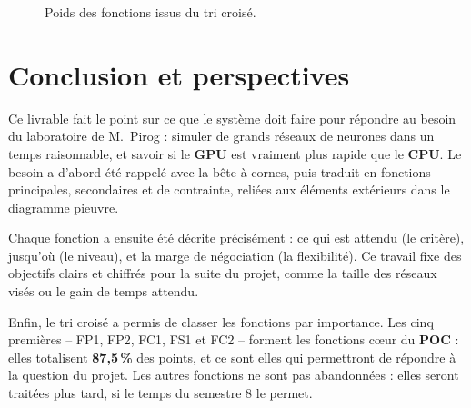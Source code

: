 \documentclass{report}
\begin{document}
\begin{figure}[H]
\centering
{}
\caption{Poids des fonctions issus du tri croisé.}
\label{fig:barres}
\end{figure}

\chapter{Conclusion et perspectives}

Ce livrable fait le point sur ce que le système doit faire pour répondre au besoin du laboratoire de M.~Pirog : simuler de grands réseaux de neurones dans un temps raisonnable, et savoir si le \textbf{GPU} est vraiment plus rapide que le \textbf{CPU}. Le besoin a d'abord été rappelé avec la bête à cornes, puis traduit en fonctions principales, secondaires et de contrainte, reliées aux éléments extérieurs dans le diagramme pieuvre.

Chaque fonction a ensuite été décrite précisément : ce qui est attendu (le critère), jusqu'où (le niveau), et la marge de négociation (la flexibilité). Ce travail fixe des objectifs clairs et chiffrés pour la suite du projet, comme la taille des réseaux visés ou le gain de temps attendu.

Enfin, le tri croisé a permis de classer les fonctions par importance. Les cinq premières -- FP1, FP2, FC1, FS1 et FC2 -- forment les fonctions cœur du \textbf{POC} : elles totalisent \textbf{87,5\,\%} des points, et ce sont elles qui permettront de répondre à la question du projet. Les autres fonctions ne sont pas abandonnées : elles seront traitées plus tard, si le temps du semestre 8 le permet.
\end{document}
